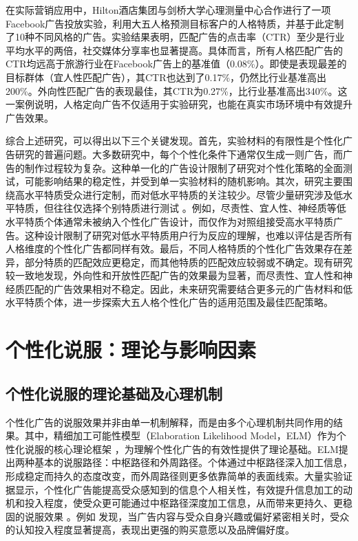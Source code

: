 在实际营销应用中，Hilton酒店集团与剑桥大学心理测量中心合作进行了一项Facebook广告投放实验，利用大五人格预测目标客户的人格特质，并基于此定制了10种不同风格的广告。实验结果表明，匹配广告的点击率（CTR）至少是行业平均水平的两倍，社交媒体分享率也显著提高。具体而言，所有人格匹配广告的CTR均远高于旅游行业在Facebook广告上的基准值（0.08\%）。即使是表现最差的目标群体（宜人性匹配广告），其CTR也达到了0.17\%，仍然比行业基准高出200\%。外向性匹配广告的表现最佳，其CTR为0.27\%，比行业基准高出340\%。这一案例说明，人格定向广告不仅适用于实验研究，也能在真实市场环境中有效提升广告效果。

综合上述研究，可以得出以下三个关键发现。首先，实验材料的有限性是个性化广告研究的普遍问题。大多数研究中，每个个性化条件下通常仅生成一则广告，而广告的制作过程较为复杂。这种单一化的广告设计限制了研究对个性化策略的全面测试，可能影响结果的稳定性，并受到单一实验材料的随机影响。其次，研究主要围绕高水平特质受众进行定制，而对低水平特质的关注较少。尽管少量研究涉及低水平特质，但往往仅选择个别特质进行测试 \citep[如][]{matz2017psychological}。例如，尽责性、宜人性、神经质等低水平特质个体通常未被纳入个性化广告设计，而仅作为对照组接受高水平特质广告。这种设计限制了研究对低水平特质用户行为反应的理解，也难以评估是否所有人格维度的个性化广告都同样有效。最后，不同人格特质的个性化广告效果存在差异，部分特质的匹配效应更稳定，而其他特质的匹配效应较弱或不确定。现有研究较一致地发现，外向性和开放性匹配广告的效果最为显著，而尽责性、宜人性和神经质匹配的广告效果相对不稳定。因此，未来研究需要结合更多元的广告材料和低水平特质个体，进一步探索大五人格个性化广告的适用范围及最佳匹配策略。


\section{个性化说服：理论与影响因素}
\label{个性化说服：理论与机制}
\subsection{个性化说服的理论基础及心理机制}
\label{个性化说服理论}
个性化广告的说服效果并非由单一机制解释，而是由多个心理机制共同作用的结果。其中，精细加工可能性模型（Elaboration Likelihood Model，ELM）作为个性化说服的核心理论框架 \citep{petty1986elaboration}，为理解个性化广告的有效性提供了理论基础。ELM提出两种基本的说服路径：中枢路径和外周路径。个体通过中枢路径深入加工信息，形成稳定而持久的态度改变，而外周路径则更多依靠简单的表面线索。大量实验证据显示，个性化广告能提高受众感知到的信息个人相关性，有效提升信息加工的动机和投入程度，使受众更可能通过中枢路径深度加工信息，从而带来更持久、更稳固的说服效果 \citep{tam2005web, hirsh2012personalized}。例如 \citet{tam2005web}发现，当广告内容与受众自身兴趣或偏好紧密相关时，受众的认知投入程度显著提高，表现出更强的购买意愿以及品牌偏好度。

